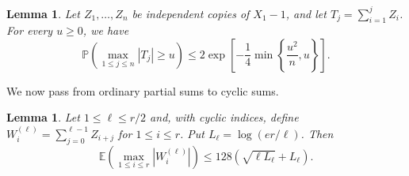 \documentclass[12pt,a4paper]{article}
\numberwithin{equation}{section}
\newtheorem{lemma}[theorem]{Lemma}
\theoremstyle{definition}
\theoremstyle{remark}
\begin{document}
\begin{lemma}\label{lem:partial-max}
Let $Z_1,\ldots,Z_n$ be independent copies of $X_1-1$, and let $T_j=\sum_{i=1}^jZ_i$.  For every $u\ge0$, we have
\begin{equation}\label{eq:partial-tail}
 \mathbb{P}\left(\max_{1\le j\le n}|T_j|\ge u\right)
 \le 2\exp\left[-\frac14\min\left\{\frac{u^2}{n},u\right\}\right].
\end{equation}
\end{lemma}

We now pass from ordinary partial sums to cyclic sums.

\begin{lemma}\label{lem:scan}
Let $1\le\ell\le r/2$ and, with cyclic indices, define
$W_i^{(\ell)}=\sum_{j=0}^{\ell-1}Z_{i+j}$ for $1\le i\le r$.  Put
$L_\ell=\log(er/\ell)$.  Then
\begin{equation}\label{eq:scan-expectation}
 \mathbb{E}\left(\max_{1\le i\le r}|W_i^{(\ell)}|\right)
 \le 128\left(\sqrt{\ell L_\ell}+L_\ell\right).
\end{equation}
\end{lemma}
\end{document}
